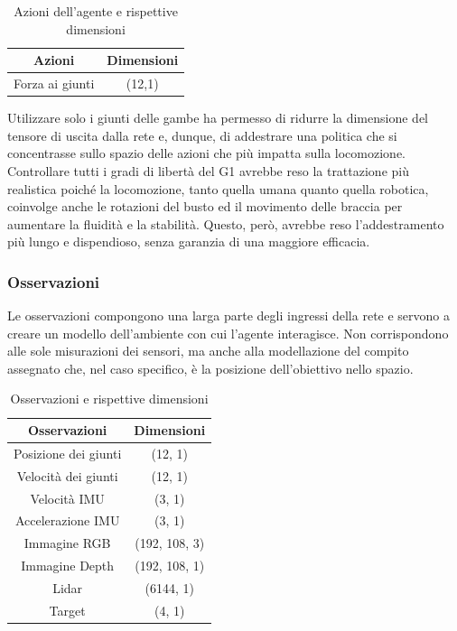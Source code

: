 \begin{table}[h]
    \centering
    \begin{tabular}{|c|c|}\hline
         \textbf{Azioni} & \textbf{Dimensioni}\\ \hline
         Forza ai giunti & (12,1)\\ \hline
    \end{tabular}
    \caption{Azioni dell'agente e rispettive dimensioni}
    \label{tab:act}
\end{table}

Utilizzare solo i giunti delle gambe ha permesso di ridurre la dimensione del tensore di uscita dalla rete e, dunque, di addestrare una politica che si concentrasse sullo spazio delle azioni che più impatta sulla locomozione. Controllare tutti i gradi di libertà del G1 avrebbe reso la trattazione più realistica poiché la locomozione, tanto quella umana quanto quella robotica, coinvolge anche le rotazioni del busto ed il movimento delle braccia per aumentare la fluidità e la stabilità. Questo, però, avrebbe reso l'addestramento più lungo e dispendioso, senza garanzia di una maggiore efficacia.




\subsubsection{Osservazioni}
Le osservazioni compongono una larga parte degli ingressi della rete e servono a creare un modello dell'ambiente con cui l'agente interagisce. Non corrispondono alle sole misurazioni dei sensori, ma anche alla modellazione del compito assegnato che, nel caso specifico, è la posizione dell'obiettivo nello spazio.


\begin{table}[h]
    \centering
    \begin{tabular}{|c|c|}
    \hline
    \textbf{Osservazioni} & \textbf{Dimensioni} \\ \hline
    Posizione dei giunti & (12, 1) \\ \hline
    Velocità dei giunti & (12, 1) \\ \hline
    Velocità IMU & (3, 1) \\ \hline
    Accelerazione IMU & (3, 1) \\ \hline
    Immagine RGB & (192, 108, 3) \\ \hline
    Immagine Depth & (192, 108, 1) \\ \hline
    Lidar & (6144, 1) \\ \hline
    Target & (4, 1) \\ \hline
    \end{tabular}
    \caption{Osservazioni e rispettive dimensioni}
    \label{tab:obs}
\end{table}

